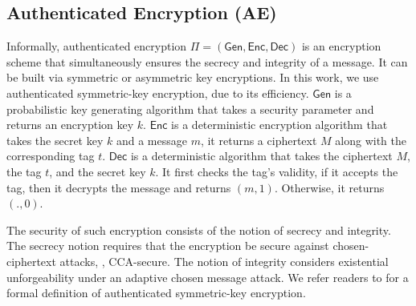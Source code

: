  
\subsection{Authenticated Encryption (AE)} 

Informally, authenticated encryption $\Pi=(\mathsf{Gen}, \mathsf{Enc}, \mathsf{Dec})$ is an encryption scheme that simultaneously ensures the secrecy and integrity of a message. It can be built via symmetric or asymmetric key encryptions. In this work, we use authenticated symmetric-key encryption, due to its efficiency. $\mathsf{Gen}$ is a probabilistic key generating algorithm that takes a security parameter and returns an encryption key $k$. $\mathsf{Enc}$ is a deterministic encryption algorithm that takes the secret key $k$ and a message $m$, it returns a ciphertext $M$ along with the corresponding tag $t$. $\mathsf{Dec}$ is a deterministic algorithm that takes the ciphertext $M$, the tag $t$, and the secret key $k$. It first checks the tag's validity, if it accepts the tag, then it decrypts the message and returns $(m,1)$. Otherwise, it returns $(.,0)$. 


The security of such encryption consists of the notion of secrecy and integrity. The secrecy notion requires that the encryption be secure against chosen-ciphertext attacks, \ie, CCA-secure. The notion of integrity considers existential unforgeability under an adaptive chosen message attack. We refer readers to \cite{KatzLindell2014} for a formal definition of authenticated symmetric-key encryption. 




